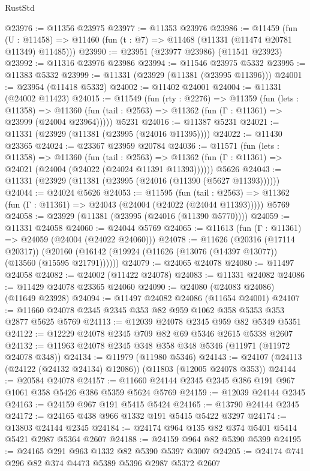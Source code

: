 \begin{lexlean}{RustStd}
\begin{coremodule}
@23976 := @11356 @23975
@23977 := @11353 @23976
@23986 := @11459
    (fun (U : @11458) => @11460 (fun (t : @7) => @11468 (@11331 (@11474 @20781 @11349) @11485)))
@23990 := @23951 (@23977 @23986) (@11541 @23923)
@23992 := @11316 @23976 @23986
@23994 := @11546 @23975 @5332
@23995 := @11383 @5332
@23999 := @11331 (@23929 (@11381 (@23995 @11396)))
@24001 := @23954 (@11418 @5332)
@24002 := @11402 @24001
@24004 := @11331 (@24002 @11423)
@24015 := @11549
    (fun (rty : @2276) =>
    @11359
      (fun (lets : @11358) =>
      @11360 (fun (tail : @2563) => @11362 (fun (Γ : @11361) => @23999 (@24004 @23964)))))
    @5231
@24016 := @11387 @5231
@24021 := @11331 (@23929 (@11381 (@23995 (@24016 @11395))))
@24022 := @11430 @23365
@24024 := @23367 @23959 @20784
@24036 := @11571
    (fun (lets : @11358) =>
    @11360
      (fun (tail : @2563) =>
      @11362 (fun (Γ : @11361) => @24021 (@24004 (@24022 (@24024 @11391 @11393))))))
    @5626
@24043 := @11331 (@23929 (@11381 (@23995 (@24016 (@11390 (@5627 @11393))))))
@24044 := @24024 @5626
@24053 := @11595
    (fun (tail : @2563) => @11362 (fun (Γ : @11361) => @24043 (@24004 (@24022 (@24044 @11393)))))
    @5769
@24058 := @23929 (@11381 (@23995 (@24016 (@11390 @5770))))
@24059 := @11331 @24058
@24060 := @24044 @5769
@24065 := @11613 (fun (Γ : @11361) => @24059 (@24004 (@24022 @24060)))
@24078 := @11626
    (@20316 (@17114 @20317))
    (@20160 (@16142 (@19924 (@11626 (@13076 (@14397 @13077)) (@13560 (@15595 @21791))))))
@24079 := @24065 @24078
@24080 := @11497 @24058
@24082 := @24002 (@11422 @24078)
@24083 := @11331 @24082
@24086 := @11429 @24078 @23365 @24060
@24090 := @24080 (@24083 @24086) (@11649 @23928)
@24094 := @11497 @24082 @24086 (@11654 @24001)
@24107 := @11660 @24078 @2345 @2345 @353 @82 @959 @1062 @358 @5353 @353 @2877 @5625 @5769
@24113 := @12039 @24078 @2345 @959 @82 @5349 @5351
@24122 := @12229 @24078 @2345 @709 @82 @69 @5346 @2615 @5338 @2607
@24132 := @11963 @24078 @2345 @348 @358 @348 @5346 (@11971 (@11972 @24078 @348))
@24134 := @11979 (@11980 @5346)
@24143 := @24107 (@24113 (@24122 (@24132 @24134) @12086)) (@11803 (@12005 @24078 @353))
@24144 := @20584 @24078
@24157 := @11660 @24144 @2345 @2345 @386 @191 @967 @1061 @358 @5426 @386 @5359 @5624 @5769
@24159 := @12039 @24144 @2345
@24163 := @24159 @967 @191 @5415 @5424
@24165 := @13790 @24144 @2345
@24172 := @24165 @438 @966 @1332 @191 @5415 @5422 @3297
@24174 := @13803 @24144 @2345
@24184 := @24174 @964 @135 @82 @374 @5401 @5414 @5421 @2987 @5364 @2607
@24188 := @24159 @964 @82 @5390 @5399
@24195 := @24165 @291 @963 @1332 @82 @5390 @5397 @3007
@24205 := @24174 @741 @296 @82 @374 @4473 @5389 @5396 @2987 @5372 @2607

\end{coremodule}
\end{lexlean}
